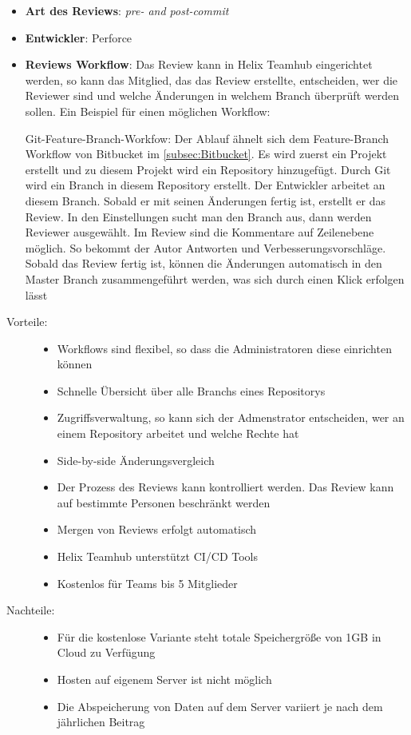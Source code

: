 \begin{itemize}
	\item \textbf{Art des Reviews}: \textit{pre- and post-commit}
	\item \textbf{Entwickler}: Perforce
	\item \textbf{Reviews Workflow}: Das Review kann in Helix Teamhub eingerichtet werden, so kann das Mitglied, das das Review erstellte, entscheiden, wer die Reviewer
		 sind und welche Änderungen in welchem Branch überprüft werden sollen.
		 Ein Beispiel für einen möglichen Workflow:
		 
		  Git-Feature-Branch-Workfow: Der Ablauf ähnelt sich dem Feature-Branch Workflow von Bitbucket im \cref{subsec:Bitbucket}.
		  Es wird zuerst ein Projekt erstellt und zu diesem Projekt wird ein Repository hinzugefügt. Durch Git wird ein Branch in diesem Repository
		  erstellt. Der Entwickler arbeitet an diesem Branch. Sobald er mit seinen Änderungen fertig ist, erstellt er das Review. In den Einstellungen sucht man den Branch aus, dann werden Reviewer
		  ausgewählt. Im Review sind die Kommentare auf Zeilenebene möglich. So bekommt der Autor Antworten und Verbesserungsvorschläge. Sobald das Review fertig ist,
		  können die Änderungen automatisch in den Master Branch zusammengeführt werden, was sich durch einen Klick erfolgen lässt

\end{itemize}

\begin{description}
	\item [Vorteile:] \hfill
	\begin{itemize}
		\item Workflows sind flexibel, so dass die Administratoren diese einrichten können
		\item Schnelle Übersicht über alle Branchs eines Repositorys
		\item Zugriffsverwaltung, so kann sich der Admenstrator entscheiden, wer an einem Repository arbeitet und welche Rechte hat
		\item Side-by-side Änderungsvergleich
		\item Der Prozess des Reviews kann kontrolliert werden. Das Review kann auf bestimmte Personen beschränkt werden
		\item Mergen von Reviews erfolgt automatisch
		\item Helix Teamhub unterstützt \ac{CI}/\ac{CD} Tools
		\item Kostenlos für Teams bis 5 Mitglieder
	\end{itemize}
	
	\item [Nachteile:] \hfill
	\begin{itemize}
	\item Für die kostenlose Variante steht totale Speichergröße von 1GB in Cloud zu Verfügung
	\item Hosten auf eigenem Server ist nicht möglich
	\item Die Abspeicherung von Daten auf dem Server variiert je nach dem jährlichen Beitrag
	\end{itemize}
\end{description}


